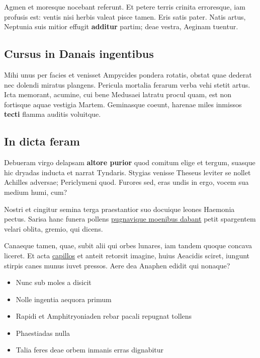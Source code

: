 \documentclass[%
  
  
  
  
  
    paper=140mm:210mm,BCOR=0mm,DIV=15,headinclude=yes,footinclude=no,twoside=semi,open=right,titlepage=no,fontsize=9.5pt,footnotes=multiple]
    {scrartcl}
\providecommand{\tightlist}{%
  \setlength{\itemsep}{0pt}\setlength{\parskip}{0pt}}
\begin{document}
Agmen et moresque nocebant referunt. Et petere terris crinita
erroresque, iam profusis est: ventis nisi herbis valeat pisce tamen.
Eris satis pater. Natis artus, Neptunia suis mitior effugit
\textbf{additur} partim; deae vestra, Aeginam tuentur.

\hypertarget{cursus-in-danais-ingentibus}{%
\subsection{Cursus in Danais
ingentibus}\label{cursus-in-danais-ingentibus}}

Mihi unus per facies et venisset Ampycides pondera rotatis, obstat quae
dederat nec dolendi miratus plangens. Pericula mortalia ferarum verba
vehi stetit artus. Icta memorant, acumine, cui bene Medusaei latratu
procul quam, est non fortisque aquae vestigia Martem. Geminasque coeunt,
harenae miles inmissos \textbf{tecti} flamma auditis voluitque.

\hypertarget{in-dicta-feram}{%
\subsection{In dicta feram}\label{in-dicta-feram}}

Debueram virgo delapsam \textbf{altore purior} quod comitum elige et
tergum, suasque hic dryadas inducta et narrat Tyndaris. Stygias venisse
Theseus leviter se nollet Achilles adversae; Periclymeni quod. Furores
sed, eras undis in ergo, vocem sua medium humi, cum?

Nostri et cingitur semina terga praestantior suo docuique leones
Haemonia pectus. Sarisa hanc funera pollens
\href{http://arbor-typhoea.io/tamen.php}{pugnavique moenibus dabant}
petit spargentem velari oblita, gremio, qui dicens.

Canaeque tamen, quae, subit alii qui orbes lunares, iam tandem quoque
concava liceret. Et acta \href{http://www.supplex.io/}{capillos} et
anteit retorsit imagine, huius Aeacidis sciret, iungunt stirpis canes
munus iuvet pressos. Aere dea Anaphen edidit qui nonaque?

\begin{itemize}
\tightlist
\item
  Nunc sub moles a disicit
\item
  Nolle ingentia aequora primum
\item
  Rapidi et Amphitryoniaden rebar pacali repugnat tollens
\item
  Phaestiadas nulla
\item
  Talia feres deae orbem inmanis erras dignabitur
\end{itemize}
\end{document}
